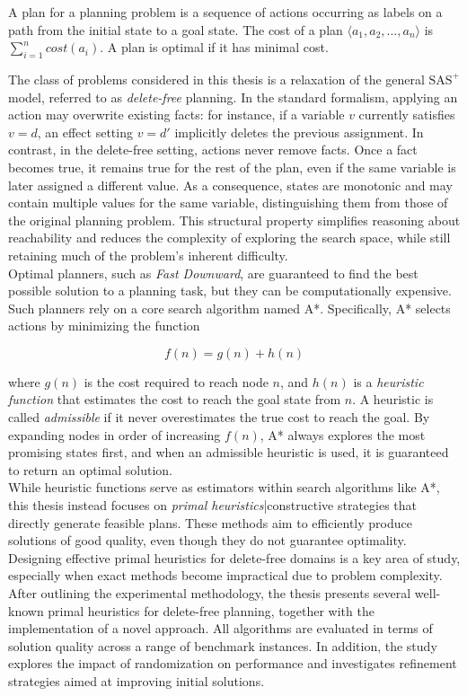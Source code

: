 \begin{definition}[Plan]
	\label{def:plan}
	A plan for a planning problem is a sequence of actions occurring as labels on a path
	from the initial state to a goal state.
	The cost of a plan $\langle a_1, a_2, \dots, a_n \rangle$ is $\sum_{i = 1}^n cost(a_i)$.
	A plan is optimal if it has minimal cost.
\end{definition}

The class of problems considered in this thesis is a relaxation of the general $\text{SAS}^+$ model,
referred to as \textit{delete-free} planning.
In the standard formalism, applying an action may overwrite existing facts:
for instance, if a variable $v$ currently satisfies $v = d$, an effect setting $v = d'$
implicitly deletes the previous assignment.
In contrast, in the delete-free setting, actions never remove facts.
Once a fact becomes true, it remains true for the rest of the plan, even if the same variable
is later assigned a different value.
As a consequence, states are monotonic and may contain multiple values for the same variable,
distinguishing them from those of the original planning problem.
This structural property simplifies reasoning about reachability and reduces the complexity of
exploring the search space, while still retaining much of the problem's inherent difficulty.\\
Optimal planners, such as \textit{Fast Downward}, are guaranteed to find the best possible solution to a planning task, but they can be
computationally expensive. Such planners rely on a core search algorithm named \textsc{A*}.
Specifically, \textsc{A*} selects actions by minimizing the function

\begin{equation*}
	f(n) = g(n) + h(n)
\end{equation*}

where $g(n)$ is the cost required to reach node $n$, and $h(n)$ is a \textit{heuristic function} that estimates the cost to reach the goal state from $n$.
A heuristic is called \textit{admissible} if it never overestimates the true cost to reach the goal.
By expanding nodes in order of increasing $f(n)$, \textsc{A*} always explores the most promising states first,
and when an admissible heuristic is used, it is guaranteed to return an optimal solution.\\
While heuristic functions serve as estimators within search algorithms like \textsc{A*},
this thesis instead focuses on \textit{primal heuristics}|constructive strategies that directly generate feasible plans.
These methods aim to efficiently produce solutions of good quality, even though they do not guarantee optimality.
Designing effective primal heuristics for delete-free domains is a key area of study, especially when exact methods become
impractical due to problem complexity.\\
After outlining the experimental methodology, the thesis presents several well-known primal heuristics for delete-free planning,
together with the implementation of a novel approach.
All algorithms are evaluated in terms of solution quality across a range of benchmark instances. In addition, the study explores the impact of
randomization on performance and investigates refinement strategies aimed at improving initial solutions.
